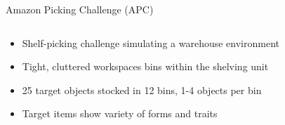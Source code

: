 \begin{columns}[t]
\begin{column}{0.50\textwidth}
\begin{block}{\large Amazon Picking Challenge (APC)}
	    		\vspace{-0.2in}
		    \begin{columns}[T]
		    	\begin{column}{0.98\textwidth}
					\begin{itemize}
						\item Shelf-picking challenge simulating a warehouse environment
						\item Tight, cluttered workspaces bins within the shelving unit
						\item 25 target objects stocked in 12 bins, 1-4 objects per bin
						\item Target items show variety of forms and traits
					\end{itemize}
				\end{column}
			\end{columns}
		\end{block}
	\end{column}
\end{columns}	
		    
